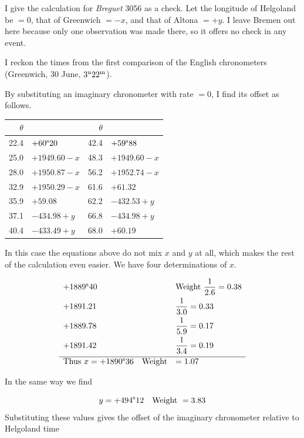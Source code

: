 I give the calculation for \emph{Breguet} 3056 as a check. Let the longitude of Helgoland be $=0$, that of Greenwich $=-x$, and that of Altona $=+y$. I leave Bremen out here because only one observation was made there, so it offers no check in any event.

I reckon the times from the first comparison of the English chronometers (Greenwich, 30 June, $3^{\rm u}22^{\rm m}$).

By substituting an imaginary chronometer with rate $=0$, I find its offset as follows.

\begin{center}
\begin{tabular}{r|l||r|l}
$\theta$ & & $\theta$ & \\
\hline
22.4 & $+60^{\rm s}20$ & 42.4 & $+59^{\rm s}88$ \\
25.0 & $+1949.60-x$ & 48.3 & $+1949.60-x$ \\
28.0 & $+1950.87-x$ & 56.2 & $+1952.74-x$ \\
32.9 & $+1950.29-x$ & 61.6 & $+61.32$ \\
35.9 & $+59.08$ & 62.2 & $-432.53+y$ \\
37.1 & $-434.98+y$ & 66.8 & $-434.98+y$ \\
40.4 & $-433.49+y$ & 68.0 & $+60.19$ \\
\end{tabular}
\end{center}

In this case the equations above do not mix $x$ and $y$ at all, which makes the rest of the calculation even easier. We have four determinations of $x$.

\[
\begin{array}{ll}
+1889^{\rm s}40 & \text{Weight } \dfrac{1}{2.6}=0.38 \\[7pt]
+1891.21 & \dfrac{1}{3.0}=0.33 \\[7pt]
+1889.78 & \dfrac{1}{5.9}=0.17 \\[7pt]
+1891.42 & \dfrac{1}{3.4}=0.19 \\[7pt]
\hline
\text{Thus } x=+1890^{\rm s}36 \quad \text{Weight} & =1.07
\end{array}
\]

In the same way we find

\[
y=+494^{\rm s}12 \quad \text{Weight } =3.83
\]
\noindent Substituting these values gives the offset of the imaginary chronometer relative to Helgoland time

